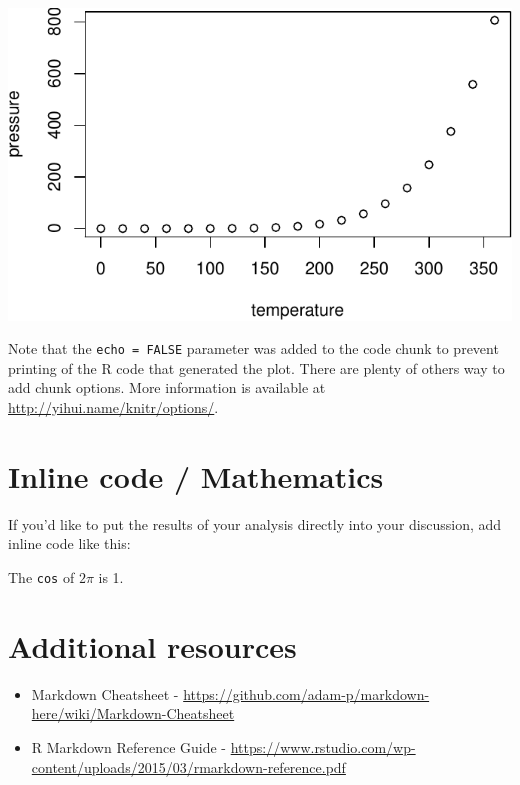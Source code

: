 \documentclass[12pt,twoside]{reedthesis}
\begin{document}
  \begin{CodeChunk}
  
  
  \begin{center}\includegraphics{skeleton_files/figure-latex/pressure-1} \end{center}
  
  \end{CodeChunk}
  
  Note that the \texttt{echo\ =\ FALSE} parameter was added to the code
  chunk to prevent printing of the R code that generated the plot. There
  are plenty of others way to add chunk options. More information is
  available at \url{http://yihui.name/knitr/options/}.
  
  \section{Inline code / Mathematics}\label{inline-code-mathematics}
  
  If you'd like to put the results of your analysis directly into your
  discussion, add inline code like this:
  
  The \texttt{cos} of \(2 \pi\) is 1.
  
  \section{Additional resources}\label{additional-resources}
  
  \begin{itemize}
  \item
    Markdown Cheatsheet -
    \url{https://github.com/adam-p/markdown-here/wiki/Markdown-Cheatsheet}
  \item
    R Markdown Reference Guide -
    \url{https://www.rstudio.com/wp-content/uploads/2015/03/rmarkdown-reference.pdf}
  \end{itemize}
  
\end{document}
